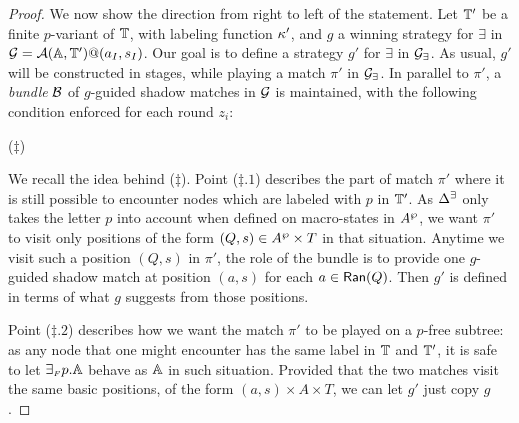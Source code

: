 \begin{proof}
We now show the direction from right to left of the statement. Let $\mathbb{T}'$ be a finite $p$-variant of
$\mathbb{T}$, with labeling function $\kappa'$, and $g$ a winning strategy for $\exists$ in $\mathcal{G} = \mathcal{A}(\mathbb{A},\mathbb{T}')@(a_I,s_I)$. Our goal is to define a strategy $g'$ for $\exists$ in $\mathcal{G_{\exists}}$. As usual, $g'$ will be constructed in stages, while playing a match $\pi'$ in $\mathcal{G_{\exists}}$. In parallel to $\pi'$, a \emph{bundle} $\mathcal{B}$ of $g$-guided shadow matches in $\mathcal{G}$ is maintained, with the following condition enforced for each round $z_i$:
\smallskip
\begin{center}
\hspace*{0.3cm}($\ddag$)
\end{center}
\smallskip
We recall the idea behind ($\ddag$). Point ($\ddag.1$) describes the part of match $\pi'$ where it is still possible to encounter nodes which are labeled with $p$ in $\mathbb{T}'$. As $\Delta^\exists$ only takes the letter $p$ into account when defined on macro-states in $A^{\wp}$, we want $\pi'$ to visit only positions of the form $(Q,s) \in A^{\wp} \times T$ in that situation. Anytime we visit such a position $(Q,s)$ in $\pi'$, the role of the bundle is to provide one $g$-guided shadow match at position $(a,s)$ for each $a \in \mathsf{Ran}(Q)$.
Then $g'$ is defined in terms of what $g$ suggests from those positions.

 Point ($\ddag.2$) describes how we want the match $\pi'$ to be
 played on a $p$-free subtree: as any node that one might encounter has the same label in $\mathbb{T}$ and $\mathbb{T}'$,
it is safe to let ${\exists_{{\scriptscriptstyle F}} p}.\mathbb{A}$ behave as $\mathbb{A}$ in such situation. Provided that the two matches visit the same basic positions, of the form $(a,s)\times A \times T$, we can let $g'$ just copy $g$.


\end{proof}

